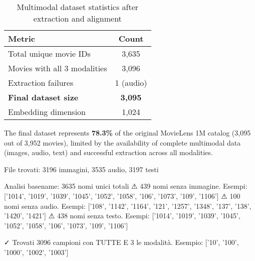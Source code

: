 \begin{table}[h]
\centering
\begin{tabular}{lc}
\hline
\textbf{Metric} & \textbf{Count} \\
\hline
Total unique movie IDs & 3,635 \\
Movies with all 3 modalities & 3,096 \\
Extraction failures & 1 (audio) \\
\textbf{Final dataset size} & \textbf{3,095} \\
Embedding dimension & 1,024 \\
\hline
\end{tabular}
\caption{Multimodal dataset statistics after extraction and alignment}
\end{table}

The final dataset represents \textbf{78.3\%} of the original MovieLens 1M catalog (3,095 out of 3,952 movies), limited by the availability of complete multimodal data (images, audio, text) and successful extraction across all modalities.




File trovati: 3196 immagini, 3535 audio, 3197 testi

Analisi basename: 3635 nomi unici totali
  ⚠ 439 nomi senza immagine. Esempi: ['1014', '1019', '1039', '1045', '1052', '1058', '106', '1073', '109', '1106']
  ⚠ 100 nomi senza audio. Esempi: ['108', '1142', '1164', '121', '1257', '1348', '137', '138', '1420', '1421']
  ⚠ 438 nomi senza testo. Esempi: ['1014', '1019', '1039', '1045', '1052', '1058', '106', '1073', '109', '1106']

✓ Trovati 3096 campioni con TUTTE E 3 le modalità. Esempio: ['10', '100', '1000', '1002', '1003']